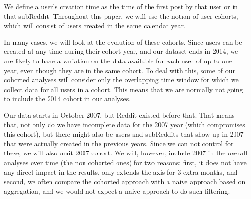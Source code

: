 We define a user's creation time as the time of the first post by that user or in that subReddit.  Throughout this paper, we will use the notion of user cohorts, which will consist of users created in the same calendar year.

In many cases, we will look at the evolution of these cohorts. Since users can be created at any time during their cohort year, and our dataset ends in 2014, 
we are likely to have a variation on the data available for each user of up to one year, even though they are in the same cohort.  To deal with this, some of our cohorted analyses will consider only the overlapping time window for which we collect data for all users in a cohort.   This means that we are normally not going to include the 2014 cohort in our analyses.

Our data starts in October 2007, but Reddit existed before that. That means that, not only do we have incomplete data for the 2007 year (which compromises this cohort), but there might also be users and subReddits that show up in 2007 that were actually created in the previous years. Since we can not control for these, we will also omit 2007 cohort. We will, however, include 2007 in the overall analyses over time (the non cohorted ones) for two reasons: first, it does not have any direct impact in the results, only extends the axis for 3 extra months, and second, we often compare the cohorted approach with a naive approach based on aggregation, and we would not expect a naive approach to do such filtering. 